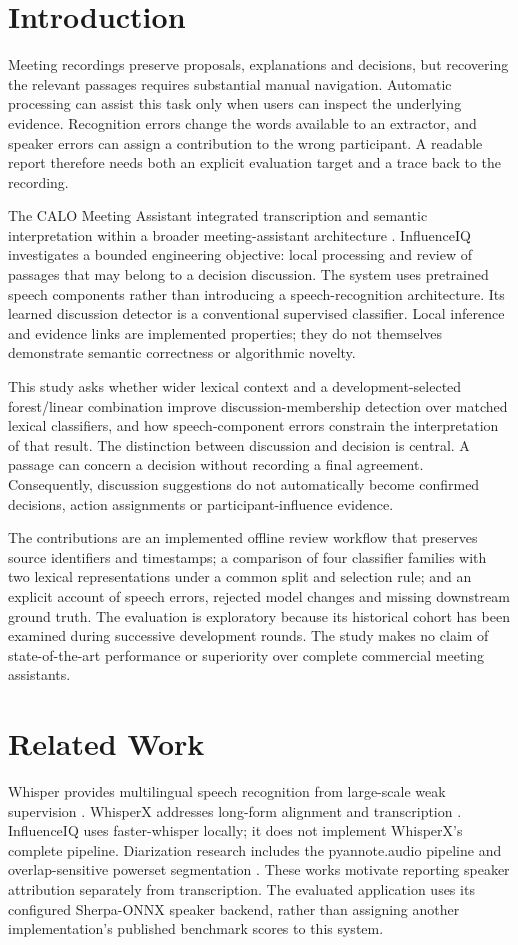 \documentclass[conference,a4paper]{IEEEtran}
\begin{document}
\section{Introduction}
Meeting recordings preserve proposals, explanations and decisions, but recovering the relevant passages requires substantial manual navigation. Automatic processing can assist this task only when users can inspect the underlying evidence. Recognition errors change the words available to an extractor, and speaker errors can assign a contribution to the wrong participant. A readable report therefore needs both an explicit evaluation target and a trace back to the recording.

The CALO Meeting Assistant integrated transcription and semantic interpretation within a broader meeting-assistant architecture \cite{ref1}. InfluenceIQ investigates a bounded engineering objective: local processing and review of passages that may belong to a decision discussion. The system uses pretrained speech components rather than introducing a speech-recognition architecture. Its learned discussion detector is a conventional supervised classifier. Local inference and evidence links are implemented properties; they do not themselves demonstrate semantic correctness or algorithmic novelty.

This study asks whether wider lexical context and a development-selected forest/linear combination improve discussion-membership detection over matched lexical classifiers, and how speech-component errors constrain the interpretation of that result. The distinction between discussion and decision is central. A passage can concern a decision without recording a final agreement. Consequently, discussion suggestions do not automatically become confirmed decisions, action assignments or participant-influence evidence.

The contributions are an implemented offline review workflow that preserves source identifiers and timestamps; a comparison of four classifier families with two lexical representations under a common split and selection rule; and an explicit account of speech errors, rejected model changes and missing downstream ground truth. The evaluation is exploratory because its historical cohort has been examined during successive development rounds. The study makes no claim of state-of-the-art performance or superiority over complete commercial meeting assistants.

\section{Related Work}
Whisper provides multilingual speech recognition from large-scale weak supervision \cite{ref2}. WhisperX addresses long-form alignment and transcription \cite{ref3}. InfluenceIQ uses faster-whisper locally; it does not implement WhisperX's complete pipeline. Diarization research includes the pyannote.audio pipeline \cite{ref4} and overlap-sensitive powerset segmentation \cite{ref5}. These works motivate reporting speaker attribution separately from transcription. The evaluated application uses its configured Sherpa-ONNX speaker backend, rather than assigning another implementation's published benchmark scores to this system.
\end{document}
